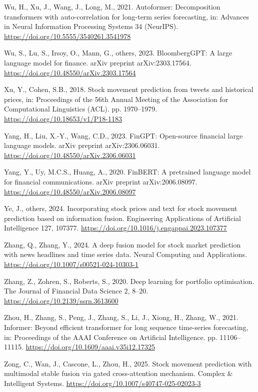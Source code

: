 \documentclass[
  11pt,
  a4paper,
]{article}
\newlength{\cslhangindent}
\newenvironment{CSLReferences}[2] %
 {\begin{list}{}{%
  \setlength{\itemindent}{0pt}
  \setlength{\leftmargin}{0pt}
  \setlength{\parsep}{0pt}
  \ifodd #1
   \setlength{\leftmargin}{\cslhangindent}
   \setlength{\itemindent}{-1\cslhangindent}
  \fi
  \setlength{\itemsep}{#2\baselineskip}}}
 {\end{list}}
\begin{document}
\begin{CSLReferences}{1}{0}
Wu, H., Xu, J., Wang, J., Long, M., 2021. Autoformer: Decomposition
transformers with auto-correlation for long-term series forecasting, in:
Advances in Neural Information Processing Systems 34 (NeurIPS).
\url{https://doi.org/10.5555/3540261.3541978}

Wu, S., Lu, S., Irsoy, O., Mann, G., others, 2023. {BloombergGPT}: A
large language model for finance. arXiv preprint arXiv:2303.17564.
\url{https://doi.org/10.48550/arXiv.2303.17564}

Xu, Y., Cohen, S.B., 2018. Stock movement prediction from tweets and
historical prices, in: Proceedings of the 56th Annual Meeting of the
Association for Computational Linguistics (ACL). pp. 1970--1979.
\url{https://doi.org/10.18653/v1/P18-1183}

Yang, H., Liu, X.-Y., Wang, C.D., 2023. {FinGPT}: Open-source financial
large language models. arXiv preprint arXiv:2306.06031.
\url{https://doi.org/10.48550/arXiv.2306.06031}

Yang, Y., Uy, M.C.S., Huang, A., 2020. {FinBERT}: A pretrained language
model for financial communications. arXiv preprint arXiv:2006.08097.
\url{https://doi.org/10.48550/arXiv.2006.08097}

Ye, J., others, 2024. Incorporating stock prices and text for stock
movement prediction based on information fusion. Engineering
Applications of Artificial Intelligence 127, 107377.
\url{https://doi.org/10.1016/j.engappai.2023.107377}

Zhang, Q., Zhang, Y., 2024. A deep fusion model for stock market
prediction with news headlines and time series data. Neural Computing
and Applications. \url{https://doi.org/10.1007/s00521-024-10303-1}

Zhang, Z., Zohren, S., Roberts, S., 2020. Deep learning for portfolio
optimisation. The Journal of Financial Data Science 2, 8--20.
\url{https://doi.org/10.2139/ssrn.3613600}

Zhou, H., Zhang, S., Peng, J., Zhang, S., Li, J., Xiong, H., Zhang, W.,
2021. Informer: Beyond efficient transformer for long sequence
time-series forecasting, in: Proceedings of the AAAI Conference on
Artificial Intelligence. pp. 11106--11115.
\url{https://doi.org/10.1609/aaai.v35i12.17325}

Zong, C., Wan, J., Cascone, L., Zhou, H., 2025. Stock movement
prediction with multimodal stable fusion via gated cross-attention
mechanism. Complex \& Intelligent Systems.
\url{https://doi.org/10.1007/s40747-025-02023-3}

\end{CSLReferences}
\end{document}
